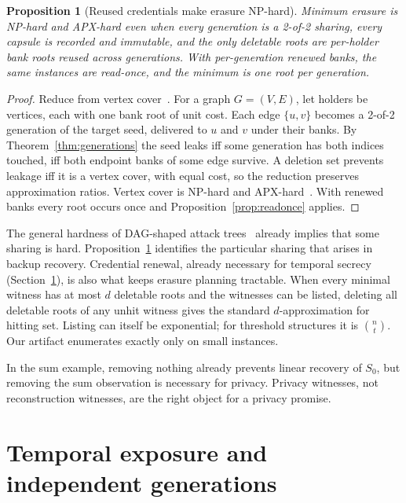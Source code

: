 \documentclass[pdflatex,sn-mathphys-num]{sn-jnl}
\theoremstyle{plain}
\newtheorem{proposition}[theorem]{Proposition}
\theoremstyle{definition}
\begin{document}
\begin{proposition}[Reused credentials make erasure NP-hard]\label{prop:hard}
Minimum erasure is NP-hard and APX-hard even when every generation is a 2-of-2 sharing, every capsule is recorded and immutable, and the only deletable roots are per-holder bank roots reused across generations. With per-generation renewed banks, the same instances are read-once, and the minimum is one root per generation.
\end{proposition}
\begin{proof}
Reduce from vertex cover~\cite{karp1972}. For a graph $G=(V,E)$, let holders be vertices, each with one bank root of unit cost. Each edge $\{u,v\}$ becomes a 2-of-2 generation of the target seed, delivered to $u$ and $v$ under their banks. By Theorem~\ref{thm:generations} the seed leaks iff some generation has both indices touched, iff both endpoint banks of some edge survive. A deletion set prevents leakage iff it is a vertex cover, with equal cost, so the reduction preserves approximation ratios. Vertex cover is NP-hard and APX-hard~\cite{karp1972,dinur2005}. With renewed banks every root occurs once and Proposition~\ref{prop:readonce} applies.
\end{proof}

The general hardness of DAG-shaped attack trees~\cite{lopuhaa2022} already implies that some sharing is hard. Proposition~\ref{prop:hard} identifies the particular sharing that arises in backup recovery. Credential renewal, already necessary for temporal secrecy (Section~\ref{sec:temporal}), is also what keeps erasure planning tractable. When every minimal witness has at most $d$ deletable roots and the witnesses can be listed, deleting all deletable roots of any unhit witness gives the standard $d$-approximation for hitting set. Listing can itself be exponential; for threshold structures it is $\binom{n}{t}$. Our artifact enumerates exactly only on small instances.

In the sum example, removing nothing already prevents linear recovery of $S_0$, but removing the sum observation is necessary for privacy. Privacy witnesses, not reconstruction witnesses, are the right object for a privacy promise.


\section{Temporal exposure and independent generations}\label{sec:temporal}
\end{document}
